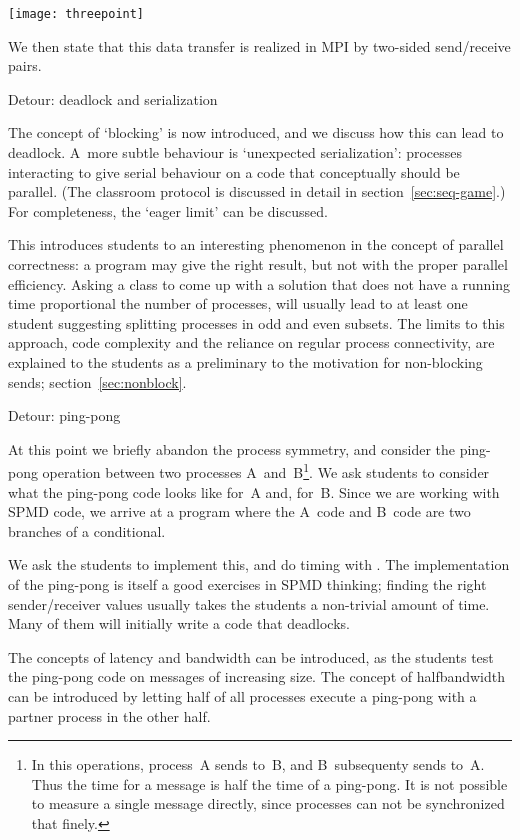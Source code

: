 \texttt{[image: threepoint]}

We then state that this data transfer is realized in MPI by two-sided
send/receive pairs.

 {Detour: deadlock and serialization}
\label{sec:p-serial}

The concept of `blocking' is now introduced, and we discuss how this
can lead to deadlock. A~more subtle behaviour is `unexpected
serialization': processes interacting to give serial behaviour on a
code that conceptually should be parallel.
(The classroom protocol is discussed in detail in section~\ref{sec:seq-game}.)
For completeness, the `eager limit' can be discussed.

This introduces students to an interesting phenomenon in the concept
of parallel correctness: a program may give the right result,
but not with the proper parallel efficiency.
Asking a class to come up with a solution that does not have a running
time proportional the number of processes, will usually lead to
at least one student suggesting splitting processes in odd and even
subsets. The limits to this approach, code complexity and the reliance
on regular process connectivity, are explained to the students as a
preliminary to the motivation for non-blocking sends; section~\ref{sec:nonblock}.

 {Detour: ping-pong}

At this point we briefly abandon the process symmetry, and consider
the ping-pong operation between two processes A~and~B\footnote {In this
operations, process~A sends to~B, and B~subsequenty sends to~A. Thus
the time for a message is half the time of a ping-pong. It is not
possible to measure a single message directly, since processes can not
be synchronized that finely.}.
We ask students
to consider what the ping-pong code looks like for~A and, for~B.
Since we are working with SPMD code, we arrive at a program where the
A~code and B~code are two branches of a conditional.

We ask the students to implement this, and do timing with
. The implementation of the ping-pong is itself a good
exercises in SPMD thinking; finding the right sender/receiver values
usually takes the students a non-trivial amount of time. Many of them
will initially write a code that deadlocks.

The concepts of latency and bandwidth can be introduced, as the students
test the ping-pong code on messages of increasing size.
The concept of halfbandwidth can be introduced by letting half of all processes
execute a ping-pong with a partner process in the other half.

